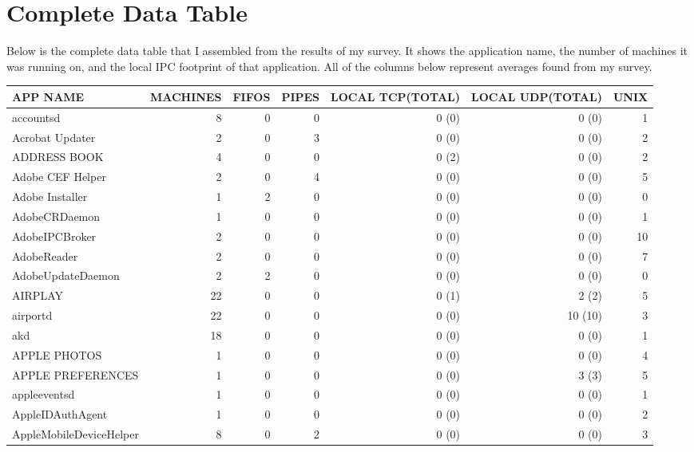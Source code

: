\chapter{Complete Data Table}
\label{appendix:allData}
Below is the complete data table that I assembled from the results of my survey.  It shows the application name, the number of machines it was running on, and the local IPC footprint of that application.  All of the columns below represent averages found from my survey.


\setlength\LTleft{-1in}
\begin{adjustwidth}{-2in}{}
\begin{scriptsize}
\begin{longtable}[l]{ l | r | r | r | r | r | r }
    \hline
    APP NAME &  MACHINES &  FIFOS &  PIPES & LOCAL TCP(TOTAL) & LOCAL UDP(TOTAL) & UNIX \\ \hline
    accountsd &  8 &  0 &  0 &  0 (0) &  0 (0) &  1 \\ \hline
    Acrobat Updater & 2 &  0 &  3 &  0 (0) &  0 (0) &  2 \\ \hline
    ADDRESS BOOK & 4 &  0 &  0 &  0 (2) &  0 (0) &  2 \\ \hline
    Adobe CEF Helper & 2 &  0 &  4 &  0 (0) &  0 (0) &  5 \\ \hline
    Adobe Installer & 1 &  2 &  0 &  0 (0) &  0 (0) &  0 \\ \hline
    AdobeCRDaemon &  1 &  0 &  0 &  0 (0) &  0 (0) &  1 \\ \hline
    AdobeIPCBroker & 2 &  0 &  0 &  0 (0) &  0 (0) & 10 \\ \hline
    AdobeReader &  2 &  0 &  0 &  0 (0) &  0 (0) &  7 \\ \hline
    AdobeUpdateDaemon &  2 &  2 &  0 &  0 (0) &  0 (0) &  0 \\ \hline
    AIRPLAY & 22 &  0 &  0 &  0 (1) &  2 (2) &  5 \\ \hline
    airportd &  22 &  0 &  0 &  0 (0) &  10 (10) &  3 \\ \hline
    akd & 18 &  0 &  0 &  0 (0) &  0 (0) &  1 \\ \hline
    APPLE PHOTOS & 1 &  0 &  0 &  0 (0) &  0 (0) &  4 \\ \hline
    APPLE PREFERENCES &  1 &  0 &  0 &  0 (0) &  3 (3) &  5 \\ \hline
    appleeventsd & 1 &  0 &  0 &  0 (0) &  0 (0) &  1 \\ \hline
    AppleIDAuthAgent & 1 &  0 &  0 &  0 (0) &  0 (0) &  2 \\ \hline
    AppleMobileDeviceHelper &  8 &  0 &  2 &  0 (0) &  0 (0) &  3 \\ \hline

\end{longtable}
\end{scriptsize}
\end{adjustwidth}
